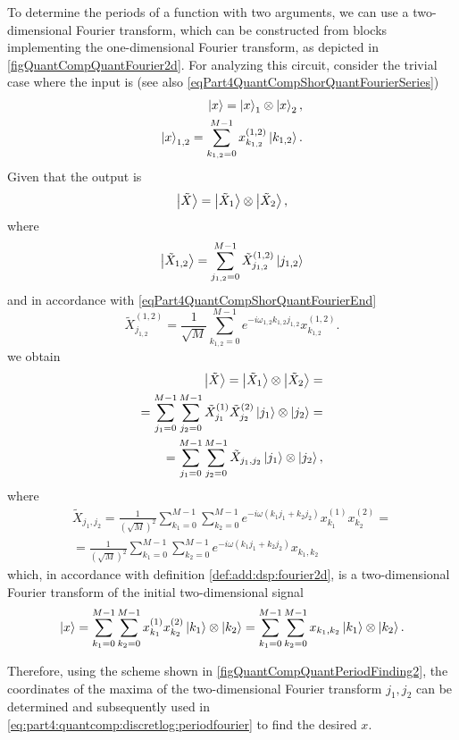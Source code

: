 To determine the periods of a function with two arguments, we can use a two-dimensional Fourier transform, which can be constructed from blocks implementing the one-dimensional Fourier transform, as depicted in \autoref{figQuantCompQuantFourier2d}. For analyzing this circuit, consider the trivial case where the input is (see also \eqref{eqPart4QuantCompShorQuantFourierSeries})
\begin{eqnarray}
\ket{x} = \ket{x}_1 \otimes \ket{x}_2,
\nonumber \\
\ket{x}_{1,2} = \sum_{k_{1,2} = 0}^{M-1} x_{k_{1,2}}^{(1,2)} \ket{k_{1,2}}.
\nonumber
\end{eqnarray}
Given that the output is
\[
\ket{\tilde{X}} = \ket{\tilde{X}_1} \otimes \ket{\tilde{X}_2},
\]
where
\[
\ket{\tilde{X}_{1,2}} = \sum_{j_{1,2} = 0}^{M-1} \tilde{X}_{j_{1,2}}^{(1,2)} \ket{j_{1,2}}
\]
and in accordance with \eqref{eqPart4QuantCompShorQuantFourierEnd}
\[
\tilde{X}_{j_{1,2}}^{(1,2)} = \frac{1}{\sqrt{M}}\sum_{k_{1,2} = 0}^{M - 1}e^{-i \omega_{1,2} k_{1,2} j_{1,2}} x_{k_{1,2}}^{(1,2)}.
\]
we obtain
\begin{eqnarray}
\ket{\tilde{X}} = \ket{\tilde{X}_1} \otimes \ket{\tilde{X}_2} = 
\nonumber \\
= \sum_{j_1 = 0}^{M-1}\sum_{j_2 = 0}^{M-1}
\tilde{X}_{j_{1}}^{(1)} \tilde{X}_{j_{2}}^{(2)} \ket{j_1} \otimes \ket{j_2} =
\nonumber \\
= \sum_{j_1 = 0}^{M-1}\sum_{j_2 = 0}^{M-1}
\tilde{X}_{j_{1},j_{2}} \ket{j_1} \otimes \ket{j_2}, 
\nonumber
\end{eqnarray}
where
\begin{eqnarray}
\tilde{X}_{j_{1},j_{2}} = \frac{1}{\left( \sqrt{M} \right)^2} 
\sum_{k_{1} = 0}^{M - 1}\sum_{k_{2} = 0}^{M - 1}
e^{-i \omega \left( k_{1} j_{1} + k_{2} j_{2}\right)}
x_{k_1}^{(1)}x_{k_2}^{(2)} =
\nonumber \\
= \frac{1}{\left( \sqrt{M} \right)^2}
\sum_{k_{1} = 0}^{M - 1}\sum_{k_{2} = 0}^{M - 1}
e^{-i \omega \left( k_{1} j_{1} + k_{2} j_{2}\right)}
x_{k_1, k_2}
\nonumber
\end{eqnarray}
which, in accordance with definition \ref{def:add:dsp:fourier2d}, is a two-dimensional Fourier transform of the initial two-dimensional signal
\[
\ket{x} = 
\sum_{k_1 = 0}^{M-1}\sum_{k_2 = 0}^{M-1}
x_{k_1}^{(1)}x_{k_2}^{(2)} \ket{k_1} \otimes \ket{k_2} =
\sum_{k_1 = 0}^{M-1}\sum_{k_2 = 0}^{M-1}
x_{k_1,k_2} \ket{k_1} \otimes \ket{k_2}.  
\]



Therefore, using the scheme shown in \autoref{figQuantCompQuantPeriodFinding2}, the coordinates of the maxima of the two-dimensional Fourier transform $j_1, j_2$ can be determined and subsequently used in \eqref{eq:part4:quantcomp:discretlog:periodfourier} to find the desired $x$.